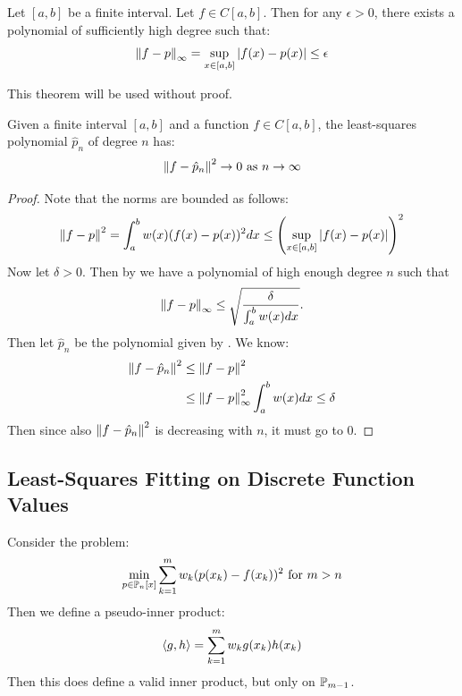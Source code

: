 \documentclass[../Main.tex]{subfiles}
\begin{document}
\begin{theorem}
    Let $[a, b]$ be a finite interval. Let $f \in C[a, b]$. Then for any $\epsilon > 0$, there exists a polynomial of sufficiently high degree such that:
    \begin{equation*}
        \norm{f - p}_{\infty} = \sup_{x \in [a, b]} \abs{f(x) - p(x)} \leq \epsilon
    \end{equation*}
    \label{thmLeastSquareInfNorm}
\end{theorem}
This theorem will be used without proof.
\begin{theorem}
    Given a finite interval $[a, b]$ and a function $f \in C[a, b]$, the least-squares polynomial $\hat{p}_n$ of degree $n$ has:
    \begin{equation*}
        \norm{f - \hat{p}_n}^2 \to 0 \text{ as } n \to \infty
    \end{equation*}
    \label{thmLeastSquareError}
\end{theorem}
\begin{proof}
    Note that the norms are bounded as follows:
    \begin{equation*}
        \norm{f - p}^2 = \int_a^b w(x) (f(x) - p(x))^2 dx \leq \left(\sup_{x \in [a, b]} \abs{f(x) - p(x)}\right)^2
    \end{equation*}
    Now let $\delta > 0$. Then by  we have a polynomial of high enough degree $n$ such that
    \begin{equation*}
        \norm{f - p}_{\infty} \leq \sqrt{\frac{\delta}{\int_{a}^{b} w(x) dx }}.
    \end{equation*}
    Then let $\hat{p}_n$ be the polynomial given by . We know:
    \begin{align*}
        \norm{f - \hat{p}_n}^2 &\leq \norm{f - p}^2 \\
        &\leq \norm{f - p}_\infty^2 \int_{a}^{b} w(x) dx \leq \delta
    \end{align*}
    Then since also $\norm{f - \hat{p}_n}^2$ is decreasing with $n$, it must go to $0$.
\end{proof}
\subsection{Least-Squares Fitting on Discrete Function Values}
Consider the problem:
\begin{equation*}
    \min_{p \in \P_n[x]} \sum_{k=1}^{m} w_k (p(x_k) - f(x_k))^2 \text{ for $m > n$}
\end{equation*}
Then we define a pseudo-inner product:
\begin{equation*}
    \inn{g}{h} = \sum_{k=1}^{m} w_k g(x_k) h(x_k)
\end{equation*}
Then this does define a valid inner product, but only on $\P_{m-1}$. %
\end{document}
